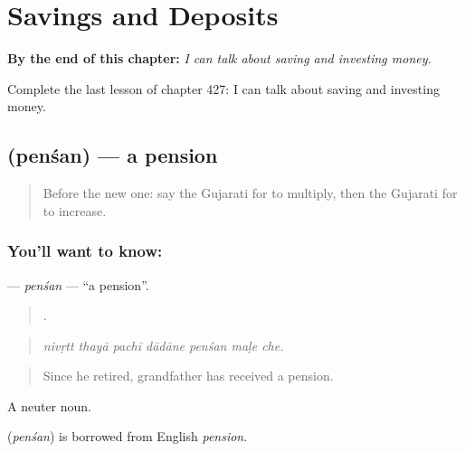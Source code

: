
\chapter{Savings and Deposits}
\label{ch:gu-savings-and-deposits}

\begin{chapteropening}
\textbf{By the end of this chapter:} \emph{I can talk about saving and investing money.}

Complete the last lesson of chapter 427: I can talk about saving and investing money.
\end{chapteropening}

\section[\texorpdfstring{\gu{પેન્શન} (penśan)}{પેન્શન (penśan)}]{ (penśan) — a pension}

\label{lesson:GU-C427-pensan}



\begin{quote}
Before the new one: say the Gujarati for to multiply, then the Gujarati for to increase.
\end{quote}

\subsection*{You'll want to know: }
\textbf{} — \emph{penśan} — \textquotedblleft{}a pension\textquotedblright{}.

\begin{quote}
      .
\end{quote}

\begin{quote}
\emph{nivṛtt thayā pachī dādāne penśan maḷe che.}
\end{quote}

\begin{quote}
Since he retired, grandfather has received a pension.
\end{quote}

A neuter noun.

\begin{cousinweb}
\textbf{} (\emph{penśan}) is borrowed from English \emph{pension}.
\end{cousinweb}


